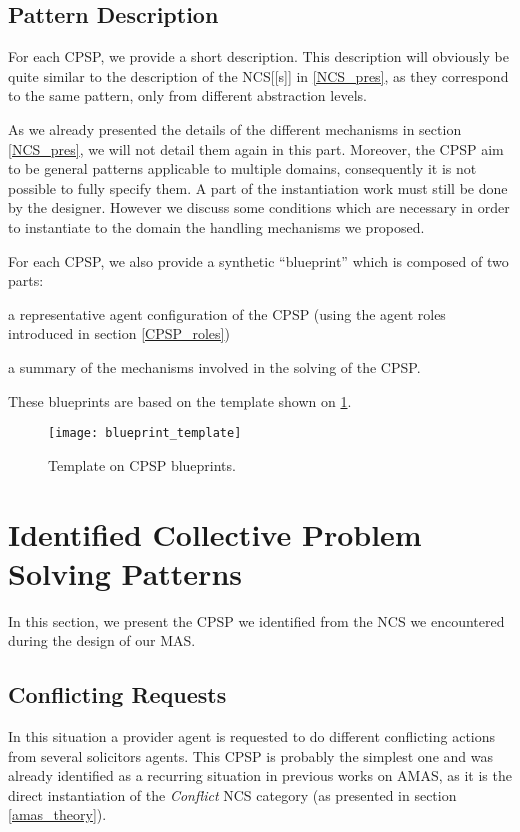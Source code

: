 \subsection{Pattern Description}

For each CPSP, we provide a short description. This description will obviously be quite similar to the description of the NCS[[s]] in \ref{NCS_pres}, as they correspond to the same pattern, only from different abstraction levels.

As we already presented the details of the different mechanisms in section \ref{NCS_pres}, we will not detail them again in this part. Moreover, the CPSP aim to be general patterns applicable to multiple domains, consequently it is not possible to fully specify them. A part of the instantiation work must still be done by the designer. However we discuss some conditions which are necessary in order to instantiate to the domain the handling mechanisms we proposed.

For each CPSP, we also provide a synthetic \enquote{blueprint} which is composed of two parts:
\begin{compactenum}
\item a representative agent configuration of the CPSP (using the agent roles introduced in section \ref{CPSP_roles}) 
\item a summary of the mechanisms involved in the solving of the CPSP.
\end{compactenum}
These blueprints are based on the template shown on \figurename{} \ref{blueprint_template}.

\begin{figure}
\centering
\texttt{[image: blueprint\_template]}
\caption{Template on CPSP blueprints.}\label{blueprint_template}
\end{figure}

\section{Identified Collective Problem Solving Patterns}

In this section, we present the CPSP we identified from the NCS we encountered during the design of our MAS.

\subsection{Conflicting Requests}

In this situation a provider agent is requested to do different conflicting actions from several solicitors agents. This CPSP is probably the simplest one and was already identified as a recurring situation in previous works on AMAS, as it is the direct instantiation of the \emph{Conflict} NCS category (as presented in section \ref{amas_theory}).

